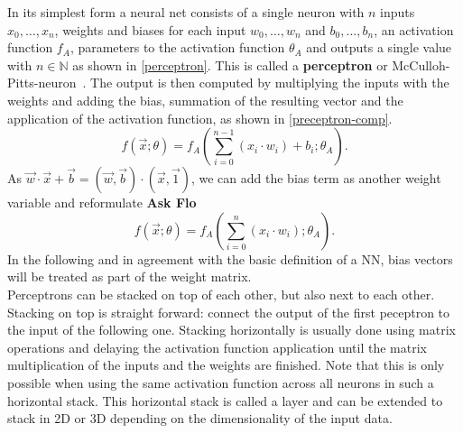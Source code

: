In its simplest form a neural net consists of a single neuron with $n$ inputs $x_0, \dots, x_n$, weights and biases for each input $w_0, \dots, w_n$ and $b_0, \dots, b_n$, an activation function $f_A$, parameters to the activation function $\theta_A$ and outputs a single value with $n \in \mathbb{N}$ as shown in \ref{perceptron}.
This is called a \textbf{perceptron} or McCulloh-Pitts-neuron~\autocite{rosenblatt_perceptron_1958, mcculloch_logical_1943}.
The output is then computed by multiplying the inputs with the weights and adding the bias, summation of the resulting vector and the application of the activation function, as shown in \ref{preceptron-comp}.
\[ f(\overrightarrow{x}; \theta) = f_A(\sum_{i = 0}^{n - 1} (x_i \cdot w_i) + b_i; \theta_A). \]
As $\overrightarrow{w} \cdot \overrightarrow{x} + \overrightarrow{b} = (\overrightarrow{w}, \overrightarrow{b}) \cdot (\overrightarrow{x}, \overrightarrow{1})$, we can add the bias term as another weight variable and reformulate \textbf{Ask Flo}
\[ f(\overrightarrow{x}; \theta) = f_A(\sum_{i = 0}^{n} (x_i \cdot w_i); \theta_A). \]
In the following and in agreement with the basic definition of a NN, bias vectors will be treated as part of the weight matrix. \\
Perceptrons can be stacked on top of each other, but also next to each other.
Stacking on top is straight forward: connect the output of the first peceptron to the input of the following one.
Stacking horizontally is usually done using matrix operations and delaying the activation function application until the matrix multiplication of the inputs and the weights are finished.
Note that this is only possible when using the same activation function across all neurons in such a horizontal stack.
This horizontal stack is called a layer and can be extended to stack in 2D or 3D depending on the dimensionality of the input data.

